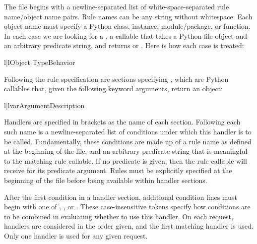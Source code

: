 The  file begins with a newline-separated list of
white-space-separated rule name/object name pairs. Rule names can be any string
without whitespace. Each object name must specify a Python class, instance,
module/package, or function. In each case we are looking for a , a
callable that takes a Python file object and an arbitrary predicate string, and
returns  or . Here is how each case is treated:

\begin{tableii}{l|l}{}{Object Type}{Behavior}
\end{tableii}

Following the rule specification are sections specifying , which
are Python callables that, given the following keyword arguments, return an
 object:

\begin{tableii}{l|l}{var}{Argument}{Description}
\end{tableii}

Handlers are specified in brackets as the name of each section. Following each
such name is a newline-separated list of conditions under which this handler is
to be called. Fundamentally, these conditions are made up of a rule name as
defined at the beginning of the file, and an arbitrary predicate string that is
meaningful to the matching rule callable. If no predicate is given, then the
rule callable will receive  for its predicate argument. Rules must
be explicitly specified at the beginning of the file before being available
within handler sections.


After the first condition in a handler section, additional condition lines must
begin with one of , , or . These case-insensitive
tokens specify how conditions are to be combined in evaluating whether to use
this handler. On each request, handlers are considered in the order given, and
the first matching handler is used. Only one handler is used for any given
request.



